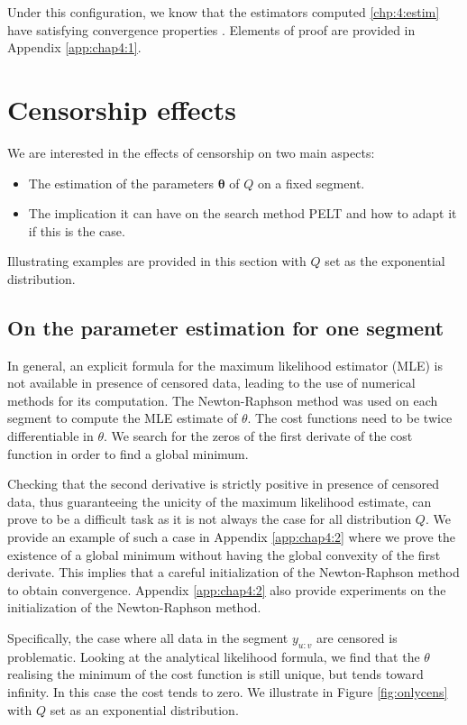 Under this configuration, we know that the estimators computed \ref{chp:4:estim} have satisfying convergence properties \citep{Lavielle1997}. Elements of proof are provided in Appendix \ref{app:chap4:1}.

\section{Censorship effects}\label{chp:4:2}

We are interested in the effects of censorship on two main aspects: 
\begin{itemize}
\item The estimation of the parameters $\bm \theta$ of $Q$ on a fixed segment. 
\item The implication it can have on the search method PELT and how to adapt it if this is the case. 
\end{itemize} 
Illustrating examples are provided in this section with $Q$ set as the exponential distribution.

\subsection{On the parameter estimation for one segment}

In general, an explicit formula for the maximum likelihood estimator (MLE) is not available in presence of censored data, leading to the use of numerical methods for its computation. The Newton-Raphson method was used on each segment to compute the MLE estimate of $\theta$. The cost functions need to be twice differentiable in $\theta$. We search for the zeros of the first derivate of the cost function in order to find a global minimum. 

Checking that the second derivative is strictly positive in presence of censored data, thus guaranteeing the unicity of the maximum likelihood estimate, can prove to be a difficult task as it is not always the case for all distribution $Q$. We provide an example of such a case in Appendix \ref{app:chap4:2} where we prove the existence of a global minimum without having the global convexity of the first derivate. This implies that a careful initialization of the Newton-Raphson method to obtain convergence. Appendix \ref{app:chap4:2} also provide experiments on the initialization of the Newton-Raphson method. 

Specifically, the case where all data in the segment $y_{u:v}$ are censored is problematic. Looking at the analytical likelihood formula, we find that the $\theta$ realising the minimum of the cost function is still unique, but tends toward infinity. In this case the cost tends to zero. We illustrate in Figure \ref{fig:onlycens} with $Q$ set as an exponential distribution. 

